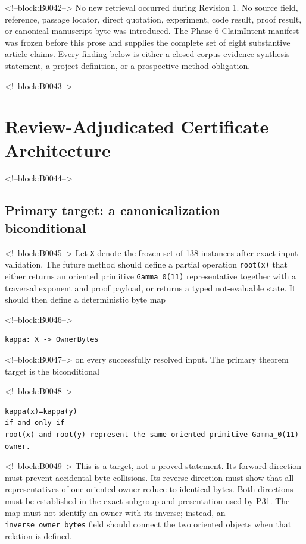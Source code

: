 \documentclass[11pt]{article}
\begin{document}
<!--block:B0042-->
No new retrieval occurred during Revision 1. No source field, reference,
passage locator, direct quotation, experiment, code result, proof
result, or canonical manuscript byte was introduced. The Phase-6
ClaimIntent manifest was frozen before this prose and supplies the
complete set of eight substantive article claims. Every finding below is
either a closed-corpus evidence-synthesis statement, a project
definition, or a prospective method obligation.

<!--block:B0043-->
\hypertarget{4-review-adjudicated-certificate-architecture}{%
\section{Review-Adjudicated Certificate
Architecture}\label{4-review-adjudicated-certificate-architecture}}

<!--block:B0044-->
\hypertarget{41-primary-target-a-canonicalization-biconditional}{%
\subsection{Primary target: a canonicalization
biconditional}\label{41-primary-target-a-canonicalization-biconditional}}

<!--block:B0045-->
Let \texttt{X} denote the frozen set of 138 instances after exact input
validation. The future method should define a partial operation
\texttt{root(x)} that either returns an oriented primitive
\texttt{Gamma\_0(11)} representative together with a traversal exponent
and proof payload, or returns a typed not-evaluable state. It should
then define a deterministic byte map

<!--block:B0046-->
\begin{verbatim}
kappa: X -> OwnerBytes
\end{verbatim}

<!--block:B0047-->
on every successfully resolved input. The primary theorem target is the
biconditional

<!--block:B0048-->
\begin{verbatim}
kappa(x)=kappa(y)
if and only if
root(x) and root(y) represent the same oriented primitive Gamma_0(11) owner.
\end{verbatim}

<!--block:B0049-->
This is a target, not a proved statement. Its forward direction must
prevent accidental byte collisions. Its reverse direction must show that
all representatives of one oriented owner reduce to identical bytes.
Both directions must be established in the exact subgroup and
presentation used by P31. The map must not identify an owner with its
inverse; instead, an \texttt{inverse\_owner\_bytes} field should connect
the two oriented objects when that relation is defined.
\end{document}
